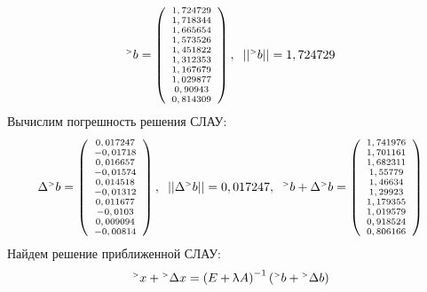 \documentclass[12pt]{article}
\begin{document}
\begin{equation*}
	\scriptsize
	{}^{\mathsmaller{>}} b =
	\left(
	\begin{array}{c}
		1,724729 \\ 1,718344 \\ 1,665654 \\ 1,573526 \\ 1,451822 \\ 1,312353 \\ 1,167679 \\ 1,029877 \\ 0,90943 \\ 0,814309
	\end{array}
	\right) ,
	\hspace{0.2cm}
	||{}^{\mathsmaller{>}} b|| = 1,724729
\end{equation*}
Вычислим погрешность решения СЛАУ:
\begin{equation*}
	\scriptsize
	\Delta {}^{\mathsmaller{>}} b =
	\left(
	\begin{array}{c}
		0,017247 \\ -0,01718 \\ 0,016657 \\ -0,01574 \\ 0,014518 \\ -0,01312 \\ 0,011677 \\ -0,0103 \\ 0,009094 \\ -0,00814
	\end{array}
	\right) ,
	\hspace{0.2cm}
	|| \Delta {}^{\mathsmaller{>}} b || = 0,017247 ,
	\hspace{0.2cm}
	 {}^{\mathsmaller{>}} b + \Delta {}^{\mathsmaller{>}} b = 
	 \left(
	 \begin{array}{c}
	 	1,741976 \\ 1,701161 \\ 1,682311 \\ 1,55779 \\ 1,46634 \\ 1,29923 \\ 1,179355 \\ 1,019579 \\ 0,918524 \\ 0,806166
	 \end{array}
	 \right)
\end{equation*}
Найдем решение приближенной СЛАУ:
\begin{equation*}
	\scriptsize
	{}^{\mathsmaller{>}} x + {}^{\mathsmaller{>}} \Delta x = \left(E + \uplambda A  \right) ^{-1} 
	\left( 
	{}^{\mathsmaller{>}} b + 
	{}^{\mathsmaller{>}} \Delta b
	\right)
\end{equation*}
\end{document}
